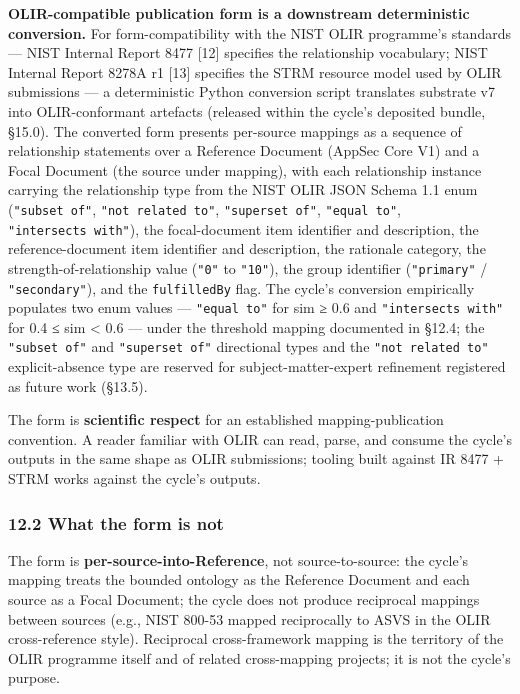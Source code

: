 \documentclass[
]{article}
\begin{document}
\textbf{OLIR-compatible publication form is a downstream deterministic
conversion.} For form-compatibility with the NIST OLIR programme's
standards --- NIST Internal Report 8477 {[}12{]} specifies the
relationship vocabulary; NIST Internal Report 8278A r1 {[}13{]}
specifies the STRM resource model used by OLIR submissions --- a
deterministic Python conversion script translates substrate v7 into
OLIR-conformant artefacts (released within the cycle's deposited bundle,
§15.0). The converted form presents per-source mappings as a sequence of
relationship statements over a Reference Document (AppSec Core V1) and a
Focal Document (the source under mapping), with each relationship
instance carrying the relationship type from the NIST OLIR JSON Schema
1.1 enum (\texttt{"subset\ of"}, \texttt{"not\ related\ to"},
\texttt{"superset\ of"}, \texttt{"equal\ to"},
\texttt{"intersects\ with"}), the focal-document item identifier and
description, the reference-document item identifier and description, the
rationale category, the strength-of-relationship value (\texttt{"0"} to
\texttt{"10"}), the group identifier (\texttt{"primary"} /
\texttt{"secondary"}), and the \texttt{fulfilledBy} flag. The cycle's
conversion empirically populates two enum values ---
\texttt{"equal\ to"} for sim ≥ 0.6 and \texttt{"intersects\ with"} for
0.4 ≤ sim \textless{} 0.6 --- under the threshold mapping documented in
§12.4; the \texttt{"subset\ of"} and \texttt{"superset\ of"} directional
types and the \texttt{"not\ related\ to"} explicit-absence type are
reserved for subject-matter-expert refinement registered as future work
(§13.5).

The form is \textbf{scientific respect} for an established
mapping-publication convention. A reader familiar with OLIR can read,
parse, and consume the cycle's outputs in the same shape as OLIR
submissions; tooling built against IR 8477 + STRM works against the
cycle's outputs.

\subsubsection{12.2 What the form is not}\label{what-the-form-is-not}

The form is \textbf{per-source-into-Reference}, not source-to-source:
the cycle's mapping treats the bounded ontology as the Reference
Document and each source as a Focal Document; the cycle does not produce
reciprocal mappings between sources (e.g., NIST 800-53 mapped
reciprocally to ASVS in the OLIR cross-reference style). Reciprocal
cross-framework mapping is the territory of the OLIR programme itself
and of related cross-mapping projects; it is not the cycle's purpose.
\end{document}

